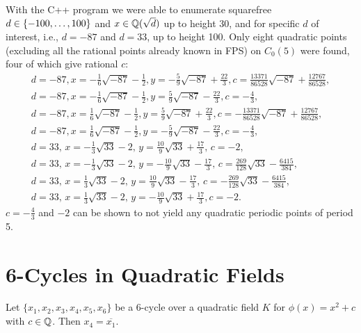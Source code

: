 With the C++ program we were able to enumerate squarefree $d \in
\left\{-100, \dots, 100\right\}$ and $x \in \mathbb{Q}(\sqrt{d})$ up to height 30, and
for specific $d$ of interest, i.e., $d = -87$ and $d = 33$,
up to height 100. Only eight quadratic points (excluding all the
rational points already known in FPS) on $C_0(5)$ were found, four of
which give rational $c$:
\[
\begin{gathered}
  d = -87,
  x = -\frac{1}{6} \sqrt{-87} - \frac{1}{2},
  y = -\frac{5}{9} \sqrt{-87} + \frac{22}{3},
  c = \frac{13371}{86528} \sqrt{-87} + \frac{12767}{86528},
  \\
  d = -87,
  x = -\frac{1}{6} \sqrt{-87} - \frac{1}{2},
  y = \frac{5}{9} \sqrt{-87} - \frac{22}{3},
  c = -\frac{4}{3},
  \\
  d = -87,
  x = \frac{1}{6} \sqrt{-87} - \frac{1}{2},
  y = \frac{5}{9} \sqrt{-87} + \frac{22}{3},
  c = -\frac{13371}{86528} \sqrt{-87} + \frac{12767}{86528},
  \\
  d = -87,
  x = \frac{1}{6} \sqrt{-87} - \frac{1}{2},
  y = -\frac{5}{9} \sqrt{-87} - \frac{22}{3},
  c = -\frac{4}{3},
  \\
  d = 33,\,
  x = -\frac{1}{3} \sqrt{33} - 2,\,
  y = \frac{10}{9} \sqrt{33} + \frac{17}{3},\,
  c = -2,
  \\
  d = 33,\,
  x = -\frac{1}{3} \sqrt{33} - 2,\,
  y = -\frac{10}{9} \sqrt{33} - \frac{17}{3},\,
  c = \frac{269}{128} \sqrt{33} - \frac{6415}{384},
  \\
  d = 33,\,
  x = \frac{1}{3} \sqrt{33} - 2,\,
  y = \frac{10}{9} \sqrt{33} - \frac{17}{3},\,
  c = -\frac{269}{128} \sqrt{33} - \frac{6415}{384},
  \\
  d = 33,\,
  x = \frac{1}{3} \sqrt{33} - 2,\,
  y = -\frac{10}{9} \sqrt{33} + \frac{17}{3},
  c = -2.
\end{gathered}
\]
$c = -\frac{4}{3}$ and $-2$ can be shown to not yield any quadratic
periodic points of period 5.


\section{6-Cycles in Quadratic Fields}

\begin{conjecture}
  \label{conj:gc}
  Let $\{x_1, x_2, x_3, x_4, x_5, x_6\}$ be a $6$-cycle over a
  quadratic field $K$ for $\phi(x) = x^2 + c$ with $c \in \mathbb{Q}$. Then
  $x_4 = \overline{x_1}$.
\end{conjecture}

